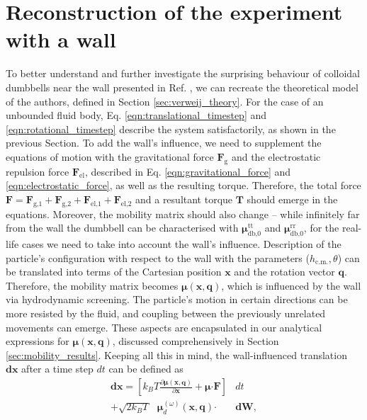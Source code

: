 \documentclass{master_thesis}
\begin{document}
\section{Reconstruction of the experiment with a wall} \label{sec:verweij_results} \label{sec:wall_results}

To better understand and further investigate the surprising behaviour of colloidal dumbbells near the wall presented in Ref. \cite{verweij2021}, we can recreate the theoretical model of the authors, defined in Section \ref{sec:verweij_theory}. For the case of an unbounded fluid body, Eq. \eqref{eqn:translational_timestep} and \eqref{eqn:rotational_timestep} describe the system satisfactorily, as shown in the previous Section. To add the wall's influence, we need to supplement the equations of motion with the gravitational force $\boldsymbol{F}_\textrm{g}$ and the electrostatic repulsion force $\boldsymbol{F}_\textrm{el}$, described in Eq. \eqref{eqn:gravitational_force} and \eqref{eqn:electrostatic_force}, as well as the resulting torque. Therefore, the total force $\boldsymbol{F} = \boldsymbol{F}_{\textrm{g,}1} + \boldsymbol{F}_{\textrm{g,}2} + \boldsymbol{F}_{\textrm{el,}1} + \boldsymbol{F}_{\textrm{el,}2}$ and a resultant torque $\boldsymbol{T}$ should emerge in the equations. Moreover, the mobility matrix should also change -- while infinitely far from the wall the dumbbell can be characterised with $\bm{\mu}^{\textrm{tt}}_{\textrm{db,}0}$ and $\bm{\mu}^{\textrm{rr}}_{\textrm{db,}0}$, for the real-life cases we need to take into account the wall's influence. Description of the particle's configuration with respect to the wall with the parameters ($h_{\textrm{c.m.}},\theta$) can be translated into terms of the Cartesian position $\boldsymbol{x}$ and the rotation vector $\boldsymbol{q}$. Therefore, the mobility matrix becomes  $\bm{\mu}(\boldsymbol{x},\boldsymbol{q})$, which is influenced by the wall via hydrodynamic screening. The particle's motion in certain directions can be more resisted by the fluid, and coupling between the previously unrelated movements can emerge. These aspects are encapsulated in our analytical expressions for $\bm{\mu}(\boldsymbol{x},\boldsymbol{q})$, discussed comprehensively in Section \ref{sec:mobility_results}. Keeping all this in mind, the wall-influenced translation $\boldsymbol{dx}$ after a time step $dt$ can be defined as
\begin{equation}
    \begin{split}
    \boldsymbol{dx} = \left[k_BT\frac{\partial\bm{\mu}(\boldsymbol{x}, \boldsymbol{q})}{\partial \boldsymbol{x}} + \bm{\mu} \bm{\cdot} \boldsymbol{F}\right] &dt \\
    + \sqrt{2 k_B T} \textrm{ } \bm{\mu}_d^{(\omega)}(\bm{x}, \bm{q}) \bm{\cdot} &\boldsymbol{dW},
    \end{split}
\label{eqn:wall_influenced_translation}
\end{equation}
\end{document}
